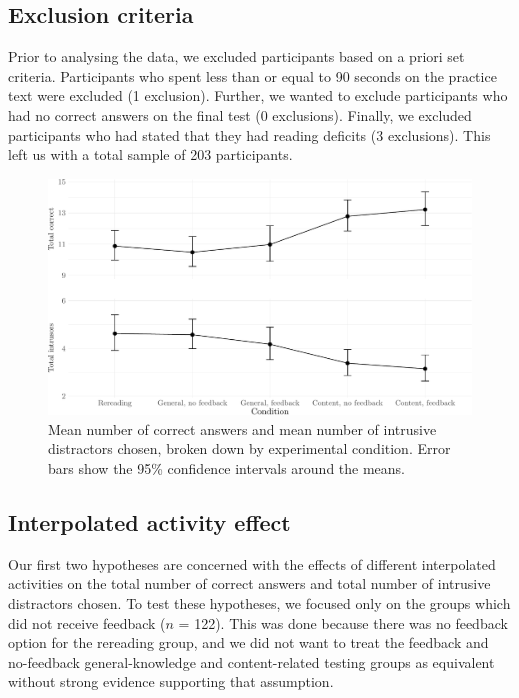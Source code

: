 

\hypertarget{exclusion-criteria}{%
\subsection{Exclusion criteria}\label{exclusion-criteria}}

Prior to analysing the data, we excluded participants based on a priori
set criteria. Participants who spent less than or equal to 90 seconds on
the practice text were excluded (1 exclusion). Further, we wanted to
exclude participants who had no correct answers on the final test (0
exclusions). Finally, we excluded participants who had stated that they
had reading deficits (3 exclusions). This left us with a total sample of
203 participants.

\begin{figure}
\centering
\includegraphics{../analyses/images/descFig-1.pdf}
\caption{Mean number of correct answers and mean number of intrusive
distractors chosen, broken down by experimental condition. Error bars
show the 95\% confidence intervals around the means.}
\end{figure}

\hypertarget{interpolated-activity-effect}{%
\subsection{Interpolated activity
effect}\label{interpolated-activity-effect}}

Our first two hypotheses are concerned with the effects of different
interpolated activities on the total number of correct answers and total
number of intrusive distractors chosen. To test these hypotheses, we
focused only on the groups which did not receive feedback (\(n\) = 122).
This was done because there was no feedback option for the rereading
group, and we did not want to treat the feedback and no-feedback
general-knowledge and content-related testing groups as equivalent
without strong evidence supporting that assumption.

